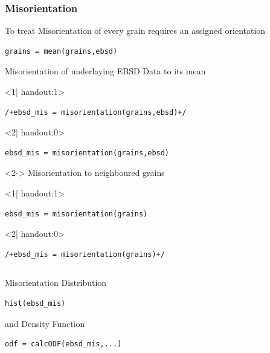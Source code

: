 \begin{frame}[fragile]
  \frametitle{Misorientation }

To treat Misorientation of every grain requires an assigned orientation
\begin{lstlisting}
grains = mean(grains,ebsd)
\end{lstlisting}

Misorientation of underlaying EBSD Data to its mean

\begin{onlyenv}<1| handout:1>
\begin{lstlisting}
/+ebsd_mis = misorientation(grains,ebsd)+/
\end{lstlisting}
\end{onlyenv}
\begin{onlyenv}<2| handout:0>
\begin{lstlisting}
ebsd_mis = misorientation(grains,ebsd)
\end{lstlisting}
\end{onlyenv}

\begin{uncoverenv}<2->
\medskip
Misorientation to neighboured grains
\begin{onlyenv}<1| handout:1>
\begin{lstlisting}
ebsd_mis = misorientation(grains)
\end{lstlisting}
\end{onlyenv}
\begin{onlyenv}<2| handout:0>
\begin{lstlisting}
/+ebsd_mis = misorientation(grains)+/
\end{lstlisting}
\end{onlyenv}

\end{uncoverenv}

\begin{columns}[t]
\begin{column}[T]{6.25cm}
\medskip
Misorientation Distribution
\begin{lstlisting}
hist(ebsd_mis)
\end{lstlisting}

and Density Function
\begin{lstlisting}
odf = calcODF(ebsd_mis,...)
\end{lstlisting}


\end{column}
\end{columns}
\end{frame}

